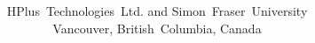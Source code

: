 \documentclass[letterpaper,titlepage,twoside]{report}
\title{\cal\Huge\textitcorr{\MMM}\\
\vspace{1ex}
\objPicture{ChannelManager.eps}}
\author{HPlus~Technologies~Ltd. and Simon~Fraser~University\\
Vancouver, British~Columbia, Canada}
\newcommand{\mymark}{}
\newcommand*{\insertpart}[2]{\clearpage\renewcommand{\mymark}{#1}#2}
\renewcommand{\mymark}{#4}%
\begin{document}

\maketitle

\insertpart{Contents}{\tableofcontents}
\insertpart{List~of~Figures}{\listoffigures}



\clearpage{}













\appendix






\insertpart{Index}{\printindex}
\end{document}
